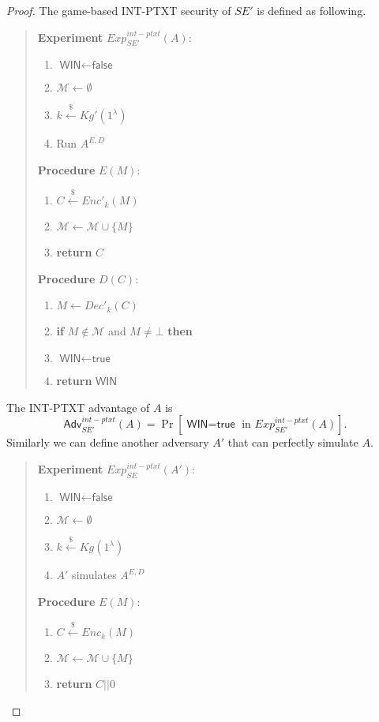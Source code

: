 \documentclass[12pt]{article}
\newcommand{\getsr}{\stackrel{\$}{\gets}}
\newcommand{\Adv}{\textsf{Adv}}
\newcommand{\tab}{\hspace{0.3in}}
\newcommand{\WIN}{\textsf{WIN}}
\newcommand{\true}{\textsf{true}}
\newcommand{\false}{\textsf{false}}
\newcommand{\M}{\mathcal{M}}
\theoremstyle{definition}
\begin{document}
\begin{proof}
The game-based INT-PTXT security of $SE'$ is defined as following.
\begin{quote}
\begin{minipage}[t]{0.35\textwidth}
{\bf Experiment} $Exp_{SE'}^{int-ptxt}(A)$:
\begin{enumerate}
\item $\WIN \gets \false$
\item $\M \gets \emptyset$
\item $k \getsr Kg'(1^\lambda)$
\item Run $A^{E,D}$
\end{enumerate}
\end{minipage}
\begin{minipage}[t]{0.5\textwidth}
{\bf Procedure} $E(M)$:
\begin{enumerate}
\item $C \getsr Enc'_k(M)$
\item $\M \gets \M \cup \{M\}$
\item {\bf return} $C$
\end{enumerate}
\end{minipage}

\begin{minipage}[t]{0.5\textwidth}
{\bf Procedure} $D(C)$:
\begin{enumerate}
\item $M \gets Dec'_k(C)$
\item {\bf if} $M \not\in \M$ and $M \not=\bot$ {\bf then}
\item \tab $\WIN \gets \true$
\item {\bf return} $\WIN$
\end{enumerate}
\end{minipage}
\end{quote}
The INT-PTXT advantage of $A$ is
$$\Adv_{SE'}^{int-ptxt}(A) = \Pr[\textrm{$\WIN = \true$ in $Exp_{SE'}^{int-ptxt}(A)$}].$$
Similarly we can define another adversary $A'$ that can perfectly simulate $A$.
\begin{quote}
\begin{minipage}[t]{0.35\textwidth}
{\bf Experiment} $Exp_{SE}^{int-ptxt}(A')$:
\begin{enumerate}
\item $\WIN \gets \false$
\item $\M \gets \emptyset$
\item $k \getsr Kg(1^\lambda)$
\item $A'$ simulates $A^{E,D}$
\end{enumerate}
\end{minipage}
\begin{minipage}[t]{0.5\textwidth}
{\bf Procedure} $E(M)$:
\begin{enumerate}
\item $C \getsr Enc_k(M)$
\item $\M \gets \M \cup \{M\}$
\item {\bf return} $C||0$
\end{enumerate}
\end{minipage}


\end{quote}
\end{proof}
\end{document}
